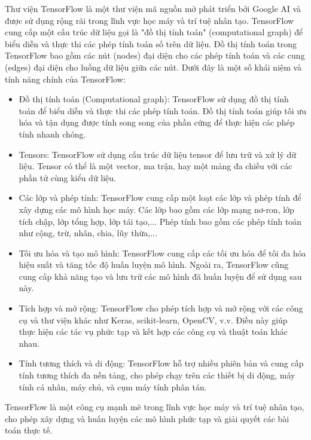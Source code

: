 Thư viện TensorFlow là một thư viện mã nguồn mở phát triển bởi Google AI và được sử dụng rộng rãi trong lĩnh vực học máy và trí tuệ nhân tạo. TensorFlow cung cấp một cấu trúc dữ liệu gọi là "đồ thị tính toán" (computational graph) để biểu diễn và thực thi các phép tính toán số trên dữ liệu. Đồ thị tính toán trong TensorFlow bao gồm các nút (nodes) đại diện cho các phép tính toán và các cung (edges) đại diện cho luồng dữ liệu giữa các nút. Dưới đây là một số khái niệm và tính năng chính của TensorFlow:

\begin{itemize}
	\item Đồ thị tính toán (Computational graph): TensorFlow sử dụng đồ thị tính toán để biểu diễn và thực thi các phép tính toán. Đồ thị tính toán giúp tối ưu hóa và tận dụng được tính song song của phần cứng để thực hiện các phép tính nhanh chóng.
	
	\item Tensors: TensorFlow sử dụng cấu trúc dữ liệu tensor để lưu trữ và xử lý dữ liệu. Tensor có thể là một vector, ma trận, hay một mảng đa chiều với các phần tử cùng kiểu dữ liệu.
	
	\item Các lớp và phép tính: TensorFlow cung cấp một loạt các lớp và phép tính để xây dựng các mô hình học máy. Các lớp bao gồm các lớp mạng nơ-ron, lớp tích chập, lớp tổng hợp, lớp tái tạo,... Phép tính bao gồm các phép tính toán như cộng, trừ, nhân, chia, lũy thừa,...
	
	\item Tối ưu hóa và tạo mô hình: TensorFlow cung cấp các tối ưu hóa để tối đa hóa hiệu suất và tăng tốc độ huấn luyện mô hình. Ngoài ra, TensorFlow cũng cung cấp khả năng tạo và lưu trữ các mô hình đã huấn luyện để sử dụng sau này.
	
	\item Tích hợp và mở rộng: TensorFlow cho phép tích hợp và mở rộng với các công cụ và thư viện khác như Keras, scikit-learn, OpenCV, v.v. Điều này giúp thực hiện các tác vụ phức tạp và kết hợp các công cụ và thuật toán khác nhau.
	
	\item Tính tương thích và di động: TensorFlow hỗ trợ nhiều phiên bản và cung cấp tính tương thích đa nền tảng, cho phép chạy trên các thiết bị di động, máy tính cá nhân, máy chủ, và cụm máy tính phân tán.
\end{itemize}

TensorFlow là một công cụ mạnh mẽ trong lĩnh vực học máy và trí tuệ nhân tạo, cho phép xây dựng và huấn luyện các mô hình phức tạp và giải quyết các bài toán thực tế.

